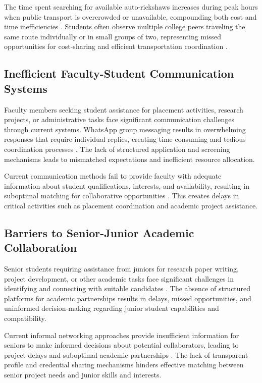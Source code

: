 \documentclass[conference]{IEEEtran}
\begin{document}
The time spent searching for available auto-rickshaws increases during peak hours when public transport is overcrowded or unavailable, compounding both cost and time inefficiencies \cite{ref10}\cite{ref11}. Students often observe multiple college peers traveling the same route individually or in small groups of two, representing missed opportunities for cost-sharing and efficient transportation coordination \cite{ref12}\cite{ref13}.

\subsection{Inefficient Faculty-Student Communication Systems}

Faculty members seeking student assistance for placement activities, research projects, or administrative tasks face significant communication challenges through current systems. WhatsApp group messaging results in overwhelming responses that require individual replies, creating time-consuming and tedious coordination processes \cite{ref14}\cite{ref15}. The lack of structured application and screening mechanisms leads to mismatched expectations and inefficient resource allocation.

Current communication methods fail to provide faculty with adequate information about student qualifications, interests, and availability, resulting in suboptimal matching for collaborative opportunities \cite{ref16}\cite{ref17}. This creates delays in critical activities such as placement coordination and academic project assistance.

\subsection{Barriers to Senior-Junior Academic Collaboration}

Senior students requiring assistance from juniors for research paper writing, project development, or other academic tasks face significant challenges in identifying and connecting with suitable candidates \cite{ref1}\cite{ref2}. The absence of structured platforms for academic partnerships results in delays, missed opportunities, and uninformed decision-making regarding junior student capabilities and compatibility.

Current informal networking approaches provide insufficient information for seniors to make informed decisions about potential collaborators, leading to project delays and suboptimal academic partnerships \cite{ref3}. The lack of transparent profile and credential sharing mechanisms hinders effective matching between senior project needs and junior skills and interests.
\end{document}
